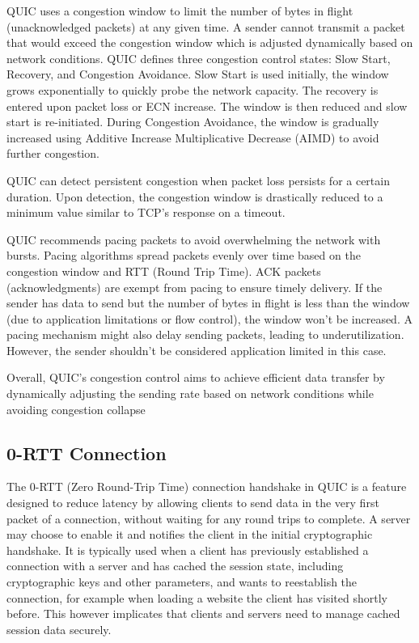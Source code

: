 QUIC uses a congestion window to limit the number of bytes in flight (unacknowledged packets) at any given time. A sender cannot
transmit a packet that would exceed the congestion window which is adjusted dynamically based on network conditions. QUIC defines
three congestion control states: Slow Start, Recovery, and Congestion Avoidance. Slow Start is used initially, the window grows
exponentially to quickly probe the network capacity. The recovery is entered upon packet loss or ECN increase. The window is
then reduced and slow start is re-initiated. During Congestion Avoidance, the window is gradually increased using Additive
Increase Multiplicative Decrease (AIMD) to avoid further congestion.

QUIC can detect persistent congestion when packet loss persists for a certain duration. Upon detection, the congestion window is
drastically reduced to a minimum value similar to TCP's response on a timeout.

QUIC recommends pacing packets to avoid overwhelming the network with bursts. Pacing algorithms spread packets evenly over time
based on the congestion window and RTT (Round Trip Time). ACK packets (acknowledgments) are exempt from pacing to ensure timely delivery.
If the sender has data to send but the number of bytes in flight is less than the window (due to application limitations or flow control),
the window won't be increased. A pacing mechanism might also delay sending packets, leading to underutilization. However, the sender
shouldn't be considered application limited in this case.

Overall, QUIC's congestion control aims to achieve efficient data transfer by dynamically adjusting the sending rate based on network
conditions while avoiding congestion collapse

\subsection{0-RTT Connection} \label{zero_rtt}

The 0-RTT (Zero Round-Trip Time) connection handshake in QUIC is a feature designed to reduce latency by allowing clients to send data in the very first packet of a connection, without waiting for any round trips to complete. A server may choose to enable it and notifies the client in the initial cryptographic handshake. It is typically used when a client has previously established a connection with a server and has cached the session state, including cryptographic keys and other parameters, and wants to reestablish the connection, for example when loading a website the client has visited shortly before. This however implicates that clients and servers need to manage cached session data securely.

